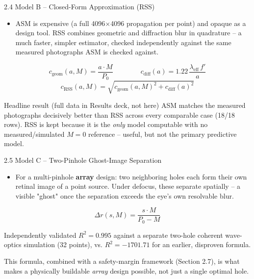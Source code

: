 \documentclass[aspectratio=169]{beamer}
\begin{document}
\begin{frame}{2.4 Model B -- Closed-Form Approximation (RSS)}
  \begin{itemize}
    \item ASM is expensive (a full 4096$\times$4096 propagation per point) and
      opaque as a design tool. RSS combines geometric and diffraction blur in
      quadrature -- a much faster, simpler estimator, checked independently
      against the same measured photographs ASM is checked against.
  \end{itemize}
  \[
    c_{\text{geom}}(a,M) = \frac{a\cdot M}{P_0}
    \qquad\qquad
    c_{\text{diff}}(a) = 1.22\,\frac{\lambda_{\text{eff}}\,f'}{a}
  \]
  \[
    c_{\text{RSS}}(a,M) = \sqrt{c_{\text{geom}}(a,M)^2 + c_{\text{diff}}(a)^2}
  \]
  \begin{alertblock}{Headline result (full data in Results deck, not here)}
    ASM matches the measured photographs decisively better than RSS across
    every comparable case (18/18 rows). RSS is kept because it is the
    \emph{only} model computable with no measured/simulated $M=0$ reference --
    useful, but not the primary predictive model.
  \end{alertblock}
\end{frame}

\begin{frame}{2.5 Model C -- Two-Pinhole Ghost-Image Separation}
  \begin{itemize}
    \item For a multi-pinhole \textbf{array} design: two neighboring holes each
      form their own retinal image of a point source. Under defocus, these
      separate spatially -- a visible "ghost" once the separation exceeds the
      eye's own resolvable blur.
  \end{itemize}
  \[
    \Delta r(s,M) = \frac{s\cdot M}{P_0 - M}
  \]
  \begin{block}{Independently validated}
    $R^2=0.995$ against a separate two-hole coherent wave-optics simulation
    (32 points), vs. $R^2=-1701.71$ for an earlier, disproven formula.
  \end{block}
  This formula, combined with a safety-margin framework (Section 2.7), is
  what makes a physically buildable \emph{array} design possible, not just a
  single optimal hole.
\end{frame}
\end{document}

